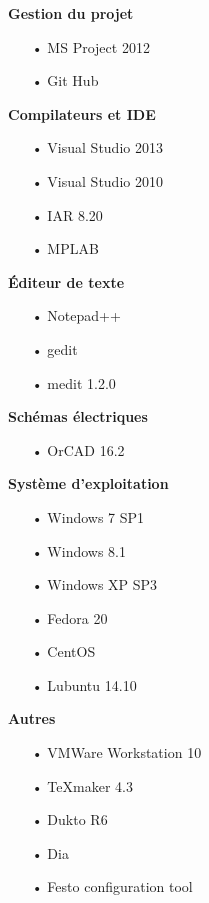 \documentclass[10pt,a4paper,final]{article}
\begin{document}
\begin{spacing}{1.5}
\begin{flushleft}
\begin{multicols}{3}
\textbf{Gestion du projet}
\begin{itemize}
\item[•]MS Project 2012
\item[•]Git Hub
\end{itemize}

\textbf{Compilateurs et IDE}
\begin{itemize}
\item[•]Visual Studio 2013
\item[•]Visual Studio 2010
\item[•]IAR 8.20
\item[•]MPLAB
\end{itemize}

\textbf{Éditeur de texte}
\begin{itemize}
\item[•]Notepad++
\item[•]gedit
\item[•]medit 1.2.0
\end{itemize}
\textbf{Schémas électriques}

\begin{itemize}
\item[•]OrCAD 16.2
\end{itemize}

\bigskip

\textbf{Système d'exploitation}
\begin{itemize}
\item[•]Windows 7 SP1
\item[•]Windows 8.1
\item[•]Windows XP SP3
\item[•]Fedora 20
\item[•]CentOS
\item[•]Lubuntu 14.10
\end{itemize}

\textbf{Autres}
\begin{itemize}
\item[•]VMWare Workstation 10
\item[•]TeXmaker 4.3
\item[•]Dukto R6
\item[•]Dia
\item[•]Festo configuration tool
\end{itemize}

\end{multicols}
\end{flushleft}
\begin{flushleft}
\HRule
\end{flushleft}


\end{spacing}
\end{document}
